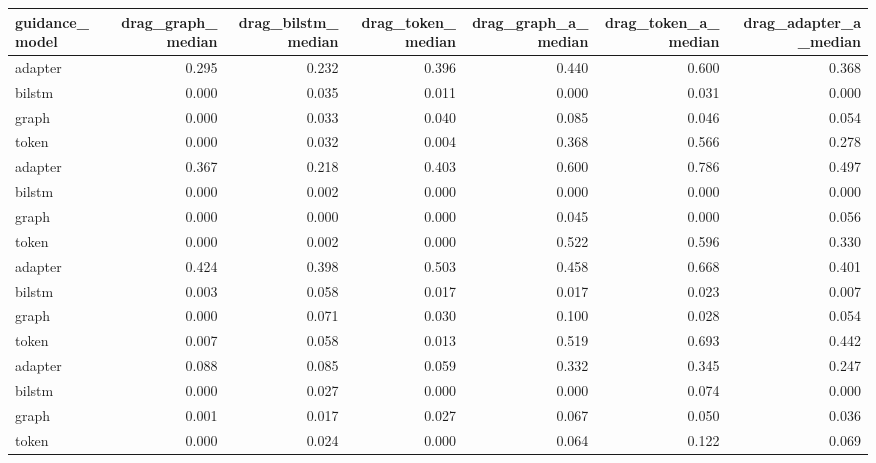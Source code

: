 \begin{tabular}{lrrrrrr}
\toprule
guidance_model & drag_graph_median & drag_bilstm_median & drag_token_median & drag_graph_a_median & drag_token_a_median & drag_adapter_a_median \\
\midrule
adapter & 0.295 & 0.232 & 0.396 & 0.440 & 0.600 & 0.368 \\
bilstm & 0.000 & 0.035 & 0.011 & 0.000 & 0.031 & 0.000 \\
graph & 0.000 & 0.033 & 0.040 & 0.085 & 0.046 & 0.054 \\
token & 0.000 & 0.032 & 0.004 & 0.368 & 0.566 & 0.278 \\
adapter & 0.367 & 0.218 & 0.403 & 0.600 & 0.786 & 0.497 \\
bilstm & 0.000 & 0.002 & 0.000 & 0.000 & 0.000 & 0.000 \\
graph & 0.000 & 0.000 & 0.000 & 0.045 & 0.000 & 0.056 \\
token & 0.000 & 0.002 & 0.000 & 0.522 & 0.596 & 0.330 \\
adapter & 0.424 & 0.398 & 0.503 & 0.458 & 0.668 & 0.401 \\
bilstm & 0.003 & 0.058 & 0.017 & 0.017 & 0.023 & 0.007 \\
graph & 0.000 & 0.071 & 0.030 & 0.100 & 0.028 & 0.054 \\
token & 0.007 & 0.058 & 0.013 & 0.519 & 0.693 & 0.442 \\
adapter & 0.088 & 0.085 & 0.059 & 0.332 & 0.345 & 0.247 \\
bilstm & 0.000 & 0.027 & 0.000 & 0.000 & 0.074 & 0.000 \\
graph & 0.001 & 0.017 & 0.027 & 0.067 & 0.050 & 0.036 \\
token & 0.000 & 0.024 & 0.000 & 0.064 & 0.122 & 0.069 \\
\bottomrule
\end{tabular}

